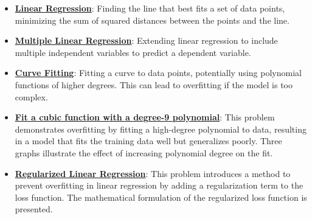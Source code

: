 \documentclass{article}%
\begin{document}
\begin{itemize}[leftmargin=*]
\item \href{https://purdue.brightspace.com/d2l/common/assets/pdfjs-d2l-dist/1.0.14-legacy/web/viewer.html?file=\%2Fcontent\%2Fenforced\%2F1095467-wl.202510.CS.24300.001\%2F05L2-ML Basics.pdf\%3Fou\%3D1095467\&lang=en-us\&container=d2l-fileviewer-rendered-pdf\&fullscreen=d2l-fileviewer-rendered-pdf-dialog\&height=667#page=6}{\textbf{Linear Regression}}: Finding the line that best fits a set of data points, minimizing the sum of squared distances between the points and the line.%
\item \href{https://purdue.brightspace.com/d2l/common/assets/pdfjs-d2l-dist/1.0.14-legacy/web/viewer.html?file=\%2Fcontent\%2Fenforced\%2F1095467-wl.202510.CS.24300.001\%2F05L2-ML Basics.pdf\%3Fou\%3D1095467\&lang=en-us\&container=d2l-fileviewer-rendered-pdf\&fullscreen=d2l-fileviewer-rendered-pdf-dialog\&height=667#page=11}{\textbf{Multiple Linear Regression}}: Extending linear regression to include multiple independent variables to predict a dependent variable.%
\item \href{https://purdue.brightspace.com/d2l/common/assets/pdfjs-d2l-dist/1.0.14-legacy/web/viewer.html?file=\%2Fcontent\%2Fenforced\%2F1095467-wl.202510.CS.24300.001\%2F05L2-ML Basics.pdf\%3Fou\%3D1095467\&lang=en-us\&container=d2l-fileviewer-rendered-pdf\&fullscreen=d2l-fileviewer-rendered-pdf-dialog\&height=667#page=13}{\textbf{Curve Fitting}}: Fitting a curve to data points, potentially using polynomial functions of higher degrees. This can lead to overfitting if the model is too complex.%
\item \href{https://purdue.brightspace.com/d2l/common/assets/pdfjs-d2l-dist/1.0.14-legacy/web/viewer.html?file=\%2Fcontent\%2Fenforced\%2F1095467-wl.202510.CS.24300.001\%2F10L1-CrossValidation.pdf\%3Fou\%3D1095467\&lang=en-us\&container=d2l-fileviewer-rendered-pdf\&fullscreen=d2l-fileviewer-rendered-pdf-dialog\&height=667#page=15}{\textbf{Fit a cubic function with a degree-9 polynomial}}: This problem demonstrates overfitting by fitting a high-degree polynomial to data, resulting in a model that fits the training data well but generalizes poorly. Three graphs illustrate the effect of increasing polynomial degree on the fit.%
\item \href{https://purdue.brightspace.com/d2l/common/assets/pdfjs-d2l-dist/1.0.14-legacy/web/viewer.html?file=\%2Fcontent\%2Fenforced\%2F1095467-wl.202510.CS.24300.001\%2F10L1-CrossValidation.pdf\%3Fou\%3D1095467\&lang=en-us\&container=d2l-fileviewer-rendered-pdf\&fullscreen=d2l-fileviewer-rendered-pdf-dialog\&height=667#page=17}{\textbf{Regularized Linear Regression}}: This problem introduces a method to prevent overfitting in linear regression by adding a regularization term to the loss function. The mathematical formulation of the regularized loss function is presented.%

\end{itemize}
\end{document}
